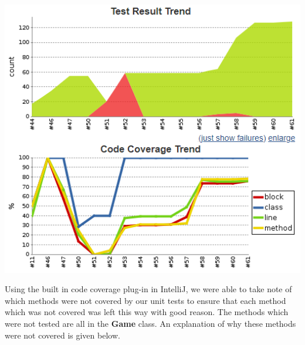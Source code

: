 \documentclass[a4paper,12pt]{extarticle}
\begin{document}
\begin{center}
\includegraphics[scale = 0.75]{Figure4.png}\\
\end{center}

\noindent Using the built in code coverage plug-in in IntelliJ, we were able to take note of which methods were not covered by our unit tests to ensure that each method which was not covered was left this way with good reason. The methods which were not tested are all in the \textbf{Game} class. An explanation of why these methods were not covered is given below.
\end{document}
